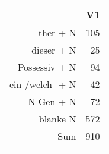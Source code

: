 \begin{tabular}{rr}
  \lsptoprule
 & V1 \\ 
  \midrule
ther + N & 105 \\ 
  dieser + N &  25 \\ 
  Possessiv + N &  94 \\ 
  ein-/welch- + N &  42 \\ 
  N-Gen + N &  72 \\ 
  blanke N & 572 \\ 
  Sum & 910 \\ 
   \lspbottomrule
\end{tabular}
